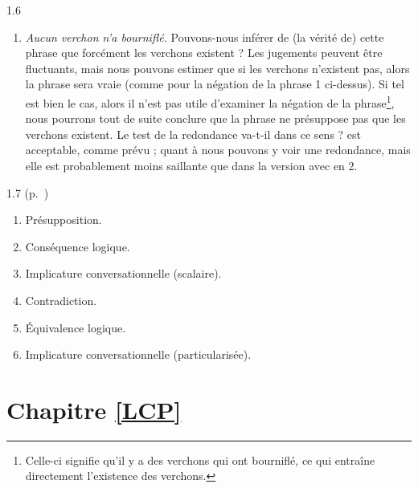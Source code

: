 \begin{Solution}{1.{6}}
\begin{enumerate}
\item \emph{Aucun verchon n'a bourniflé.}  Pouvons-nous inférer de (la vérité de) cette phrase que forcément les verchons existent ? Les jugements peuvent être fluctuants, mais nous pouvons estimer que si les verchons n'existent pas, alors la phrase sera vraie (comme pour la négation de la phrase 1 ci-dessus). Si tel est bien le cas, alors il n'est pas utile d'examiner la négation de la phrase\footnote{Celle-ci signifie qu'il y a des verchons qui ont bourniflé, ce qui entraîne directement l'existence des verchons.}, nous pourrons tout de suite conclure que la phrase ne présuppose pas que les verchons existent. Le test de la redondance va-t-il dans ce sens ?  est acceptable, comme prévu ; quant à  nous pouvons y voir une redondance, mais elle est probablement moins saillante que dans la version avec  en 2.
\end{enumerate}
\end{Solution}
\begin{Solution}{1.{7}}
(p.~\pageref{exo:1RelSem})

\begin{enumerate}
\item Présupposition.
\item Conséquence logique.
\item Implicature conversationnelle (scalaire).
\item Contradiction.
\item Équivalence logique.
\item Implicature conversationnelle (particularisée).
\end{enumerate}
\end{Solution}
\protect \section {Chapitre \protect \ref {LCP}}
